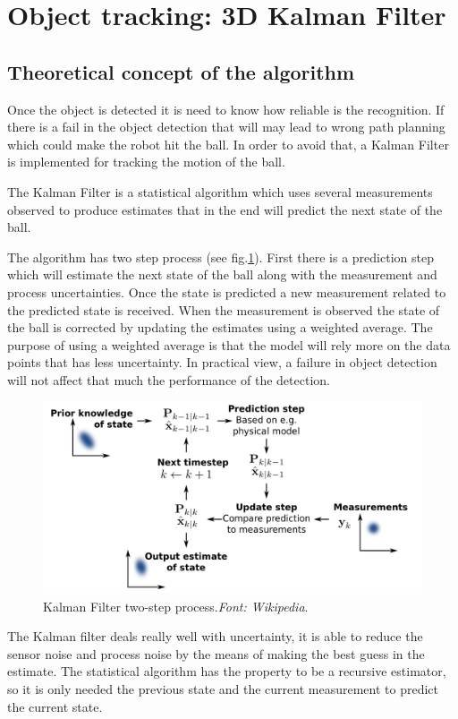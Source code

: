 \newpage
\setlength{\parskip}{1em}
\section{Object tracking: 3D Kalman Filter}
\label{sec:kal}
\subsection{Theoretical concept of the algorithm}
Once the object is detected it is need to know how reliable is the recognition. If there is a fail in the object detection that will may lead to wrong path planning which could make the robot hit the ball. In order to avoid that, a Kalman Filter is implemented for tracking the motion of the ball.\par
The Kalman Filter is a statistical algorithm which uses several measurements observed to produce estimates that in the end will predict the next state of the ball.\par
The algorithm has two step process (see fig.\ref{fig:kf_sch}). First there is a prediction step which will estimate the next state of the ball along with the measurement and process uncertainties. Once the state is predicted a new measurement related to the predicted state is received. When the measurement is observed the state of the ball is corrected by updating the estimates using a weighted average. The purpose of using a weighted average is that the model will rely more on the data points that has less uncertainty. In practical view, a failure in object detection will not affect that much the performance of the detection.
\begin{figure}[ht!]
    \centering
    \captionsetup{justification=centering,margin=1cm}
    \includegraphics[scale = 0.2]{Images/kf/basic_sch.png}
    \caption[]{Kalman Filter two-step process.\textit{Font: Wikipedia}.}
    \label{fig:kf_sch}
\end{figure}%
The Kalman filter deals really well with uncertainty, it is able to reduce the sensor noise and process noise by the means of making the best guess in the estimate. The statistical algorithm has the property to be a recursive estimator, so it is only needed the previous state and the current measurement to predict the current state.

